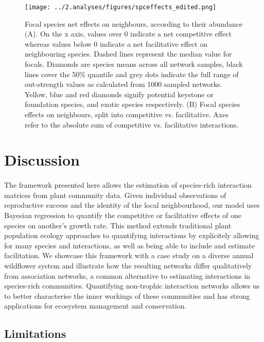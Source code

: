 \documentclass[a4,12pt]{article}
\begin{document}
    \begin{figure}[H]
        \hspace*{-1cm}
        \texttt{[image: ../2.analyses/figures/spceffects\_edited.png]}
        \caption{Focal species net effects on neighbours, according to their abundance (A). On the x axis, values over 0 indicate a net competitive effect whereas values below 0 indicate a net facilitative effect on neighbouring species. Dashed lines represent the median value for focals. Diamonds are species means across all network samples, black lines cover the 50\% quantile and grey dots indicate the full range of out-strength values as calculated from 1000 sampled networks. Yellow, blue and red diamonds signify potential keystone or foundation species, and exotic species respectively. (B) Focal species effects on neighbours, split into competitive vs. facilitative. Axes refer to the absolute sum of competitive vs. facilitative interactions.}
        \label{fig:species}
    \end{figure} 


\section{Discussion}
    
    \paragraph{}
    The framework presented here allows the estimation of species-rich interaction matrices from plant community data. Given individual observations of reproductive success and the identity of the local neighbourhood, our model uses Bayesian regression to quantify the competitive or facilitative effects of one species on another's growth rate. This method extends traditional plant population ecology approaches to quantifying interactions by explicitely allowing for many species and interactions, as well as being able to include and estimate facilitation. We showcase this framework with a case study on a diverse annual wildflower system and illustrate how the resulting networks differ qualitatively from association networks, a common alternative to estimating interactions in species-rich communities. Quantifying non-trophic interaction networks allows us to better characterise the inner workings of these communities and has strong applications for ecosystem management and conservation. 

    \subsection{Limitations}
        
\end{document}
